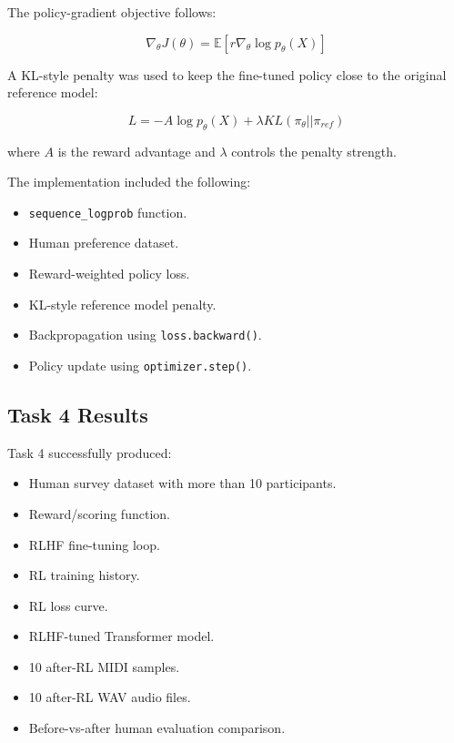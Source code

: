 \documentclass[conference]{IEEEtran}
\begin{document}
The policy-gradient objective follows:

\begin{equation}
\nabla_{\theta}J(\theta) = \mathbb{E}[r \nabla_{\theta}\log p_{\theta}(X)]
\end{equation}

A KL-style penalty was used to keep the fine-tuned policy close to the original reference model:

\begin{equation}
L = -A \log p_{\theta}(X) + \lambda KL(\pi_{\theta}||\pi_{ref})
\end{equation}

where $A$ is the reward advantage and $\lambda$ controls the penalty strength.

The implementation included the following:

\begin{itemize}
    \item \texttt{sequence\_logprob} function.
    \item Human preference dataset.
    \item Reward-weighted policy loss.
    \item KL-style reference model penalty.
    \item Backpropagation using \texttt{loss.backward()}.
    \item Policy update using \texttt{optimizer.step()}.
\end{itemize}

\subsection{Task 4 Results}

Task 4 successfully produced:

\begin{itemize}
    \item Human survey dataset with more than 10 participants.
    \item Reward/scoring function.
    \item RLHF fine-tuning loop.
    \item RL training history.
    \item RL loss curve.
    \item RLHF-tuned Transformer model.
    \item 10 after-RL MIDI samples.
    \item 10 after-RL WAV audio files.
    \item Before-vs-after human evaluation comparison.
\end{itemize}
\end{document}
